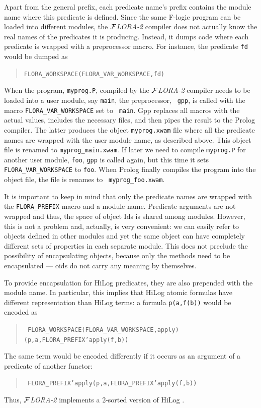 \documentclass[11pt]{article}
\newcommand{\FLORA}{{\mbox{${\cal F}${\small\it LORA}\rm\emph{-2}}}\xspace}
\newcommand{\fl}{\mbox{F-logic}\xspace}
\newcommand{\ofile}{xwam}
\begin{document}
Apart from the general prefix, each predicate name's prefix contains the module
name where this predicate is defined. Since the same \fl program
can be loaded into different modules, the \FLORA compiler does not actually
know the real names of the predicates it is producing. Instead, it dumps
code where each predicate is wrapped with a preprocessor macro. For
instance, the predicate {\tt fd} would be dumped as
\begin{quote}
 \tt FLORA\_WORKSPACE(FLORA\_VAR\_WORKSPACE,fd)  
\end{quote}
When the program, {\tt myprog.P}, compiled by the \FLORA compiler needs to
be loaded into a user module, say {\tt main}, the preprocessor, {\tt
  gpp}, is called with the macro {\tt FLORA\_VAR\_WORKSPACE} set to {\tt
  main}. Gpp replaces all macros with the actual values, includes the
necessary files, and then pipes the result to the Prolog compiler. The latter
produces the object {\tt myprog.\ofile} file where all the predicate names are
wrapped with the user module name, as described above.  This object file is
renamed to {\tt myprog\_main.\ofile}. If later we need to compile {\tt myprog.P}
for another user module, {\tt foo}, {\tt gpp} is called again, but this time it
sets {\tt FLORA\_VAR\_WORKSPACE} to {\tt foo}. When Prolog finally compiles
the program into the object file, the file is renames to {\tt
  myprog\_foo.\ofile}.

It is important to keep in mind that only the predicate names are wrapped
with the {\tt FLORA\_PREFIX} macro and a module name. Predicate arguments
are not wrapped and thus, the space of object Ids is shared among modules.
However, this is not a problem and, actually, is very convenient: we can
easily refer to objects defined in other modules and yet the same object
can have completely different sets of properties in each separate module.
This does not preclude the possibility of encapsulating objects, because
only the methods need to be encapsulated --- oids do not carry any meaning
by themselves.

To provide encapsulation for HiLog predicates, they are also prepended with
the module name. In particular, this implies that HiLog atomic formulas
have different representation than HiLog terms: a formula {\tt p(a,f(b))}
would be encoded as
\begin{quote}
 \tt
 FLORA\_WORKSPACE(FLORA\_VAR\_WORKSPACE,apply)(p,a,FLORA\_PREFIX'apply(f,b))  
\end{quote}
The same term would be encoded differently if it occurs as an argument of a
predicate of another functor:
\begin{quote}
 \tt
 FLORA\_PREFIX'apply(p,a,FLORA\_PREFIX'apply(f,b))    
\end{quote}
Thus, \FLORA implements a 2-sorted version of HiLog \cite{hilog-icdt-95}.
\end{document}
